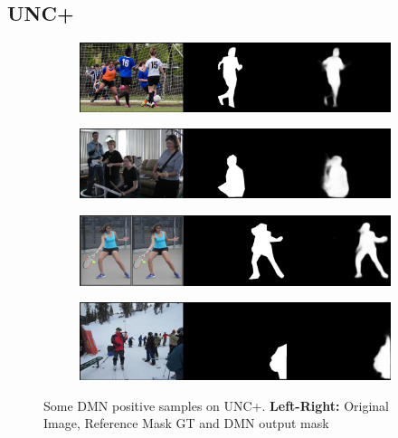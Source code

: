 \subsection*{UNC+}
\begin{figure}[!htbp]
    \centering
    \begin{subfigure}[b]{\columnwidth}
            \centering
            \includegraphics[width=\textwidth]{./figures/unc_plus_samples/5.png}
    \end{subfigure}
    
    \begin{subfigure}[b]{\columnwidth}
            \centering
            \includegraphics[width=\textwidth]{./figures/unc_plus_samples/6.png}
    \end{subfigure}
    
    \begin{subfigure}[b]{\columnwidth}
            \centering
            \includegraphics[width=\textwidth]{./figures/unc_plus_samples/3.png}
    \end{subfigure}
    
    \begin{subfigure}[b]{\columnwidth}
            \centering
            \includegraphics[width=\textwidth]{./figures/unc_plus_samples/4.png}
    \end{subfigure}
    \caption{Some DMN positive samples on UNC+. \textbf{Left-Right:} Original Image, Reference Mask GT and DMN output mask}
    \label{fig:my_label}
\end{figure}
